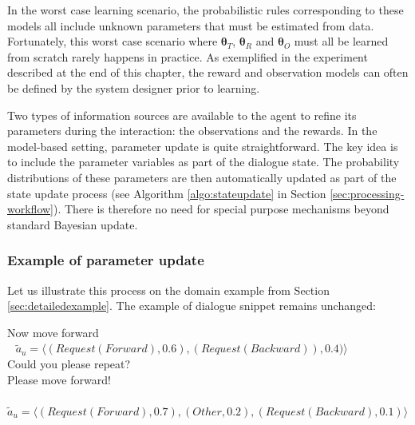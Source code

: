 In the worst case learning scenario, the probabilistic rules corresponding to these models all include unknown parameters that must be estimated from data.  Fortunately, this worst case scenario where $\boldsymbol\theta_T$, $\boldsymbol\theta_R$ and $\boldsymbol\theta_O$ must all be learned from scratch rarely happens in practice. As exemplified in the experiment described at the end of this chapter, the reward and observation models can often be defined by the system designer prior to learning. 

Two types of information sources are available to the agent to refine its parameters during the interaction: the observations and the rewards.  In the model-based setting, parameter update is quite straightforward.  The key idea is to include the parameter variables as part of the dialogue state.  The probability distributions of these parameters are then automatically updated as part of the state update process (see Algorithm \ref{algo:stateupdate} in Section \ref{sec:processing-workflow}). There is therefore no need for special purpose mechanisms beyond standard Bayesian update.

\subsubsection*{Example of parameter update}

Let us illustrate this process on the domain example from Section \ref{sec:detailedexample}.  The example of dialogue snippet remains unchanged:
 \begin{dialogue} 
 Now move forward \\ $\phantom{b}$ $\tilde{a}_u = \langle (\mathit{Request(Forward)}, 0.6), (\mathit{Request(Backward)}), 0.4)\rangle$  \\[-3mm]
 Could you please repeat? \\[-3mm]
 Please move forward! \\ $\phantom{b}$ $\tilde{a}_u = \langle (\mathit{Request(Forward)}, 0.7), (\mathit{Other}, 0.2), (\mathit{Request(Backward)}, 0.1) \rangle$ \\[-4mm]
\end{dialogue}

